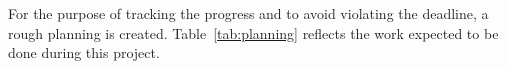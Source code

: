 For the purpose of tracking the progress and to avoid violating the deadline, a rough planning is created. Table~\ref{tab:planning} reflects the work expected to be done during this project. 

\begin{table}[!h]
\centering
{}
\caption{General project planning}
\label{tab:planning}
\end{table}

